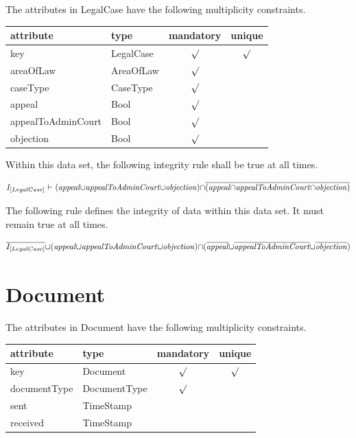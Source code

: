 \documentclass[10pt,a4paper]{report}              %
\theoremstyle{plain}\theorembodyfont{\rmfamily}\newtheorem{definition}{Definition}[section]
\theoremstyle{plain}\theorembodyfont{\rmfamily}\newtheorem{designrule}[definition]{Requirement}
\def\id#1{\mbox{\em #1\/}}
\newcommand{\cmpl}[1]{\overline{#1}}
\begin{document}
\label{sct:plug LegalCase}

The attributes in LegalCase have the following multiplicity constraints. 

\begin{center}
\begin{tabular}{llcc}
attribute & type & mandatory & unique\\
\hline
key  & LegalCase & $\surd$ & $\surd$\\
areaOfLaw & AreaOfLaw & $\surd$ & \\
caseType & CaseType & $\surd$ & \\
appeal & Bool & $\surd$ & \\
appealToAdminCourt & Bool & $\surd$ & \\
objection & Bool & $\surd$ & \\
\end{tabular}
\end{center}

Within this data set, the following integrity rule shall be true at all times. 

\[I_{[LegalCase]}\ {\vdash}\ ({\id{appeal}}{\cup}{\id{appealToAdminCourt}}{\cup}{\id{objection}}){\cap}\cmpl{({\id{appeal}}{\cap}{\id{appealToAdminCourt}}{\cap}{\id{objection}})}\]

The following rule defines the integrity of data within this data set. It must remain true at all times. 

\[\cmpl{I_{[LegalCase]}}{\cup}({\id{appeal}}{\cup}{\id{appealToAdminCourt}}{\cup}{\id{objection}}){\cap}(\cmpl{{\id{appeal}}}{\cup}\cmpl{{\id{appealToAdminCourt}}}{\cup}\cmpl{{\id{objection}}})\]

\section{Document}

\label{sct:plug Document}

The attributes in Document have the following multiplicity constraints. 

\begin{center}
\begin{tabular}{llcc}
attribute & type & mandatory & unique\\
\hline
key  & Document & $\surd$ & $\surd$\\
documentType & DocumentType & $\surd$ & \\
sent & TimeStamp &  & \\
received & TimeStamp &  & \\
\end{tabular}
\end{center}
\end{document}
